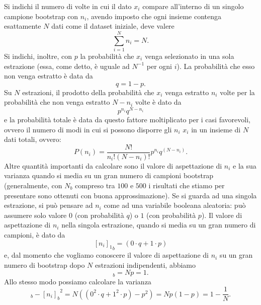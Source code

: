 \documentclass[LaM]{sapthesis}
\begin{document}
	Si indichi il numero di volte in cui il dato $x_i$ compare all'interno di un singolo campione bootstrap con $n_i$, avendo imposto che ogni insieme contenga esattamente $N$ dati come il dataset iniziale, deve valere
	\begin{equation}\label{constraint}
		\sum_{i=1}^{N}n_i=N.
	\end{equation}
	Si indichi, inoltre, con $p$ la probabilità che $x_i$ venga selezionato in una sola estrazione (essa, come detto, è uguale ad $N^{-1}$ per ogni $i$). La probabilità che esso non venga estratto è data da
	\begin{equation*}
		q=1-p.
	\end{equation*} 
	Su $N$ estrazioni, il prodotto della probabilità che $x_i$ venga estratto $n_i$ volte per la probabilità che non venga estratto $N-n_i$ volte è dato da
	\begin{equation*}
		p^{n_i}q^{N-n_i}
	\end{equation*}
	e la probabilità totale è data da questo fattore moltiplicato per i casi favorevoli, ovvero il numero di modi in cui si possono disporre gli $n_i$ $x_i$ in un insieme di $N$ dati totali, ovvero:
	\begin{equation}
		P(n_i)=\frac{N!}{n_i!(N-n_i)!}p^{n_i}q^{(N-n_i)}.
	\end{equation}
	Altre quantità importanti da calcolare sono il valore di aspettazione di $n_i$ e la sua varianza quando si media su un gran numero di campioni bootstrap (generalmente, con $N_b$ compreso tra $100$ e $500$ i risultati che stiamo per presentare sono ottenuti con buona approssimazione).
	Se si guarda ad una singola estrazione, si può pensare ad $n_i$ come ad una variabile booleana aleatoria: può assumere solo valore $0$ (con probabilità $q$) o $1$ (con probabilità $p$). Il valore di aspettazione di $n_i$ nella singola estrazione, quando si media su un gran numero di campioni, è  dato da
	\begin{equation*}
		{[n_i]_1}_b=(0\cdot q+1\cdot p)
	\end{equation*}
	e, dal momento che vogliamo conoscere il valore di aspettazione di $n_i$ su un gran numero di bootstrap dopo $N$ estrazioni indipendenti, abbiamo
	\begin{equation}
		[n_i]_b=Np=1.
	\end{equation}
	Allo stesso modo possiamo calcolare la varianza
	\begin{equation}
	[{n_i}^2]_b-{[n_i]_b}^2=N\left((0^2\cdot q+1^2\cdot p)-p^2\right)=Np(1-p)=1-\frac{1}{N}.
	\end{equation}
\end{document}

